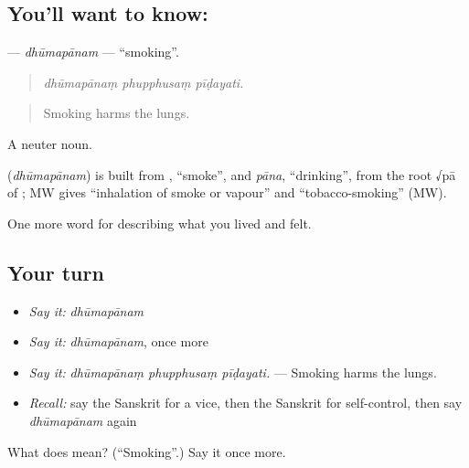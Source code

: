 \subsection*{You'll want to know: }
\textbf{} — \emph{dhūmapānam} — \textquotedblleft{}smoking\textquotedblright{}.

\begin{quote}
  
\end{quote}

\begin{quote}
\emph{dhūmapānaṃ phupphusaṃ pīḍayati.}
\end{quote}

\begin{quote}
Smoking harms the lungs.
\end{quote}

A neuter noun.

\begin{cousinweb}
\textbf{} (\emph{dhūmapānam}) is built from \textbf{}, \textquotedblleft{}smoke\textquotedblright{}, and \emph{pāna}, \textquotedblleft{}drinking\textquotedblright{}, from the root √pā of \textbf{}; MW gives \textquotedblleft{}inhalation of smoke or vapour\textquotedblright{} and \textquotedblleft{}tobacco-smoking\textquotedblright{} (MW).
\end{cousinweb}

\begin{grammarlens}[title={What you've built}]
One more word for describing what you lived and felt.
\end{grammarlens}

\subsection*{Your turn}
\begin{itemize}
\raggedright
  \item \emph{Say it:} \emph{dhūmapānam}
  \item \emph{Say it:} \emph{dhūmapānam}, once more
  \item \emph{Say it:} \emph{dhūmapānaṃ phupphusaṃ pīḍayati.} — Smoking harms the lungs.
  \item \emph{Recall:} say the Sanskrit for a vice, then the Sanskrit for self-control, then say \emph{dhūmapānam} again
\end{itemize}

\begin{tcolorbox}[breakable,colback=teal!4,colframe=teal!35!black,title={Before you move on}]
What does  mean? (\textquotedblleft{}Smoking\textquotedblright{}.) Say it once more.
\end{tcolorbox}
